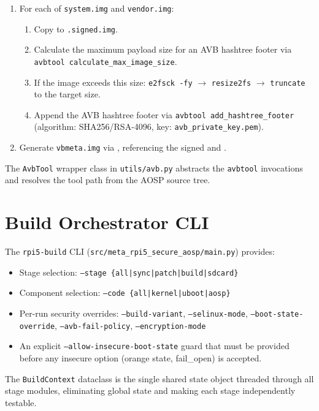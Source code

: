 \begin{enumerate}
    \item For each of \texttt{system.img} and \texttt{vendor.img}:
    \begin{enumerate}
        \item Copy to \texttt{.signed.img}.
        \item Calculate the maximum payload size for an AVB hashtree footer via \texttt{avbtool calculate\_max\_image\_size}.
        \item If the image exceeds this size: \texttt{e2fsck -fy} $\to$ \texttt{resize2fs} $\to$ \texttt{truncate} to the target size.
        \item Append the AVB hashtree footer via \texttt{avbtool add\_hashtree\_footer} (algorithm: SHA256/RSA-4096, key: \texttt{avb\_private\_key.pem}).
    \end{enumerate}
    \item \begin{sloppypar}Generate \texttt{vbmeta.img} via , referencing the signed  and 
    \cite{avb2_readme, avbtool_github}.\end{sloppypar}
\end{enumerate}

The \texttt{AvbTool} wrapper class in \texttt{utils/avb.py} abstracts the \texttt{avbtool} invocations and resolves the tool path from the AOSP source tree.

\section{Build Orchestrator CLI}
\label{sec:impl_cli}

The \texttt{rpi5-build} CLI (\texttt{src/meta\_rpi5\_secure\_aosp/main.py}) provides:

\begin{itemize}
    \item Stage selection: \texttt{--stage \{all|sync|patch|build|sdcard\}}
    \item Component selection: \texttt{--code \{all|kernel|uboot|aosp\}}
    \item Per-run security overrides: \texttt{--build-variant}, \texttt{--selinux-mode}, \texttt{--boot-state-override}, \texttt{--avb-fail-policy}, \texttt{--encryption-mode}
    \item An explicit \texttt{--allow-insecure-boot-state} guard that must be provided before any insecure option (orange state, fail\_open) is accepted.
\end{itemize}

The \texttt{BuildContext} dataclass is the single shared state object threaded through all stage modules, eliminating global state and making each stage independently testable.
